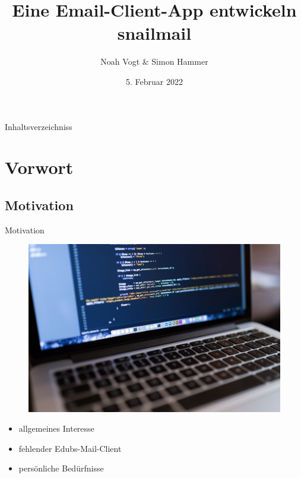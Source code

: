 \documentclass[aspectratio=169]{beamer}
\title{
    Eine Email-Client-App entwickeln\\
    \vspace{.1cm}
    \normalsize snailmail
}
\author{Noah Vogt \& Simon Hammer}
\date{5. Februar 2022}
\institute{Gymnasium Kirschgarten}
\newlength\myheight
\newlength\mydepth
\newcommand*\inlinegraphics[1]{
    \settototalheight\myheight{Xygp}
    \settodepth\mydepth{Xygp}
    \raisebox{-\mydepth}{\texttt{[image: \#1]}}%
}
\begin{document}
\begin{frame}[plain]

\maketitle

\end{frame}

\begin{frame}[plain]{Inhaltsverzeichniss}
    \tableofcontents
\end{frame}

\section{Vorwort}
\subsection{Motivation}
\begin{frame}[plain]{Motivation}
\begin{varwidth}{.5\textwidth}
        \begin{figure}
            \centering
            \includegraphics[width=.9\textwidth]{media/macbook.jpg}
        \end{figure}
    \end{varwidth}
    \hfill
    \begin{varwidth}{.5\textwidth}
        \begin{itemize}\pause
            \item allgemeines Interesse\pause
            \item fehlender Edubs-Mail-Client\pause
            \item persönliche Bedürfnisse
        \end{itemize}
    \end{varwidth} 
\end{frame}
\end{document}

